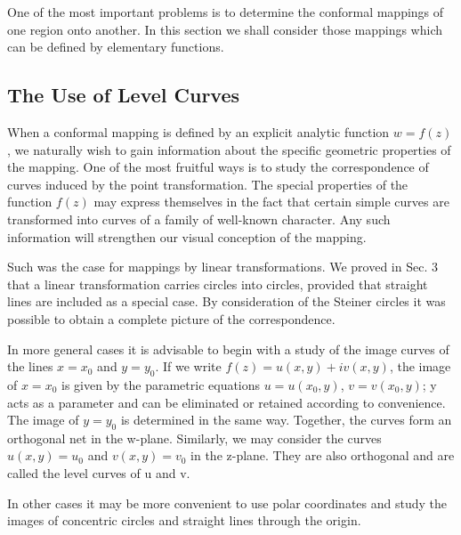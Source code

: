 One of the most important problems is to determine the conformal mappings of one region onto another. In this section we shall consider those mappings which can be defined by elementary functions.

\setcounter{section}{4}\setcounter{subsection}{0}\subsection{The Use of Level Curves}\label{sec:3.4.1}
When a conformal mapping is defined by an explicit analytic function $w = f(z)$, we naturally wish to gain information about the specific geometric properties of the mapping. One of the most fruitful ways is to study the correspondence of curves induced by the point transformation. The special properties of the function $f(z)$ may express themselves in the fact that certain simple curves are transformed into curves of a family of well-known character. Any such information will strengthen our visual conception of the mapping.

Such was the case for mappings by linear transformations. We proved in Sec. 3 that a linear transformation carries circles into circles, provided that straight lines are included as a special case. By consideration of the Steiner circles it was possible to obtain a complete picture of the correspondence.

In more general cases it is advisable to begin with a study of the image curves of the lines $x = x_{0}$ and $y = y_{0}$. If we write $f(z) = u(x,y) + iv(x,y)$, the image of $x = x_{0}$ is given by the parametric equations $u = u(x_{0},y)$, $v = v(x_{0},y)$; y acts as a parameter and can be eliminated or retained according to convenience. The image of $y = y_{0}$ is determined in the same way. Together, the curves form an orthogonal net in the w-plane. Similarly, we may consider the curves $u(x,y) = u_{0}$ and $v(x,y) = v_{0}$ in the z-plane. They are also orthogonal and are called the level curves of u and v.


In other cases it may be more convenient to use polar coordinates and study the images of concentric circles and straight lines through the origin.

